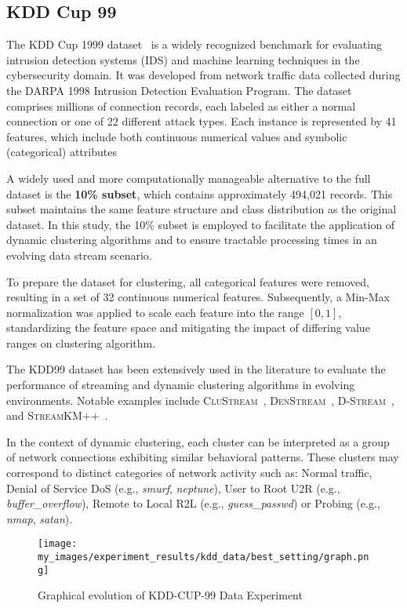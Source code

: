 \subsection{KDD Cup 99}\label{subsec:kdd_data}
The KDD Cup 1999 dataset~\cite{kdd99dataset} is a widely recognized benchmark
for evaluating intrusion detection systems (IDS) and machine learning
techniques in the cybersecurity domain. It was developed from network traffic
data collected during the DARPA 1998 Intrusion Detection Evaluation Program.
The dataset comprises millions of connection records, each labeled as either a
normal connection or one of 22 different attack types. Each instance is
represented by 41 features, which include both continuous numerical values and
symbolic (categorical) attributes

A widely used and more computationally manageable alternative to the full
dataset is the \textbf{10\% subset}, which contains approximately 494,021
records. This subset maintains the same feature structure and class
distribution as the original dataset. In this study, the 10\% subset is
employed to facilitate the application of dynamic clustering algorithms and to
ensure tractable processing times in an evolving data stream scenario.

To prepare the dataset for clustering, all categorical features were removed,
resulting in a set of 32 continuous numerical features. Subsequently, a Min-Max
normalization was applied to scale each feature into the range $[0,1]$,
standardizing the feature space and mitigating the impact of differing value
ranges on clustering algorithm.

The KDD99 dataset has been extensively used in the literature to evaluate the
performance of streaming and dynamic clustering algorithms in evolving
environments. Notable examples include \textsc{CluStream}~\cite{clustream},
\textsc{DenStream}~\cite{denstream}, \textsc{D-Stream}~\cite{d_stream}, and
\textsc{Stream\-KM++}~\cite{stream_km_plus_plus}.

In the context of dynamic clustering, each cluster can be interpreted as a
group of network connections exhibiting similar behavioral patterns. These
clusters may correspond to distinct categories of network activity such as:
Normal traffic, Denial of Service DoS (e.g., \emph{smurf}, \emph{neptune}),
User to Root U2R (e.g., \emph{buffer\_overflow}), Remote to Local R2L (e.g.,
\emph{guess\_passwd}) or Probing (e.g., \emph{nmap}, \emph{satan}).

\begin{figure}[h]
      \centering
      \texttt{[image: my\_images/experiment\_results/kdd\_data/best\_setting/graph.png]}
      \caption{Graphical evolution of KDD-CUP-99 Data Experiment}
\end{figure}

